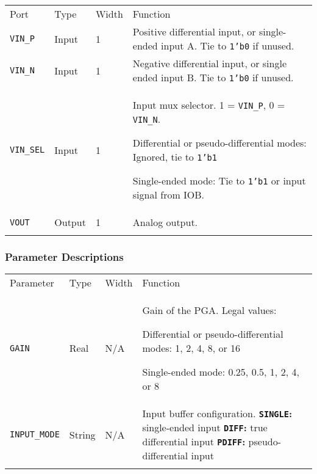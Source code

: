 \documentclass[11pt]{article}
\newcommand{\tokenstyle}[1]{\texttt{#1}}
\newcommand{\valuestyle}[1]{\texttt{#1}}
\newcommand{\strvaluestyle}[1]{\valuestyle{\textquotedbl#1\textquotedbl}}
\newcommand{\strexamplestyle}[1]{\textbf{\strvaluestyle{#1}:}}
\newcommand{\datastyle}[1]{\texttt{#1}}
\newcommand{\whenstyle}[1]{{\fontseries{sb}\selectfont#1}}
\newcommand{\thinhline}{\Xhline{1\arrayrulewidth}}
\newcommand{\thickhline}{\Xhline{2.5\arrayrulewidth}}
\newcommand{\novspace}{\vspace*{-\baselineskip}}
\begin{document}
\begin{tabularx}{\textwidth}{lllX}
\thinhline
\whenstyle{Port} & \whenstyle{Type} & \whenstyle{Width} & \whenstyle{Function} \\
\thickhline
\tokenstyle{VIN\_P} & Input & 1 & Positive differential input, or single-ended input A. Tie to \datastyle{1'b0} if unused.\\
\thinhline
\tokenstyle{VIN\_N} & Input & 1 & Negative differential input, or single ended input B. Tie to \datastyle{1'b0} if unused.\\
\thinhline
\tokenstyle{VIN\_SEL} & Input & 1 & Input mux selector. 1 = \tokenstyle{VIN\_P}, 0 = \tokenstyle{VIN\_N}.
	\begin{compactitem}
		\item Differential or pseudo-differential modes: Ignored, tie to \datastyle{1'b1}
		\item Single-ended mode: Tie to \datastyle{1'b1} or input signal from IOB.\novspace
	\end{compactitem}\\
\thinhline
\tokenstyle{VOUT} & Output & 1 & Analog output. \\
\thinhline
\end{tabularx}

\subsubsection{Parameter Descriptions}

\begin{tabularx}{\textwidth}{lllX}
\thinhline
\whenstyle{Parameter} & \whenstyle{Type} & \whenstyle{Width} & \whenstyle{Function} \\
\thickhline
\tokenstyle{GAIN} & Real & N/A &
	Gain of the PGA. Legal values:
	\begin{compactitem}
		\item Differential or pseudo-differential modes: 1, 2, 4, 8, or 16
		\item Single-ended mode: 0.25, 0.5, 1, 2, 4, or 8\novspace
	\end{compactitem}\\
\thinhline
\tokenstyle{INPUT\_MODE} & String & N/A &
	Input buffer configuration. \newline
	\strexamplestyle{SINGLE} single-ended input \newline
	\strexamplestyle{DIFF} true differential input \newline
	\strexamplestyle{PDIFF} pseudo-differential input
\\
\thinhline
\end{tabularx}
\end{document}

